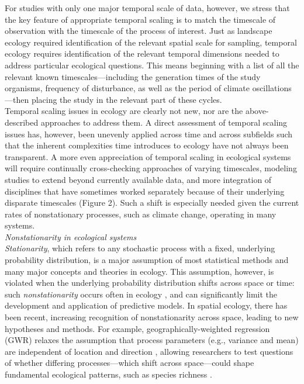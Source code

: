 \documentclass[11pt,a4paper,oneside]{article}
\begin{document}
For studies with only one major temporal scale of data, however, we stress that the key feature of appropriate temporal scaling is to match the timescale of observation with the timescale of the process of interest. Just as landscape ecology required identification of the relevant spatial scale for sampling, temporal ecology requires identification of the relevant temporal dimensions needed to address particular ecological questions. This means beginning with a list of all the relevant known timescales---including the generation times of the study organisms, frequency of disturbance, as well as the period of climate oscillations---then placing the study in the relevant part of these cycles. \\

Temporal scaling issues in ecology are clearly not new, nor are the above-described approaches to address them. A direct assessment of temporal scaling issues has, however, been unevenly applied across time and across subfields such that the inherent complexities time introduces to ecology have not always been transparent. A more even appreciation of temporal scaling in ecological systems will require continually cross-checking approaches of varying timescales, modeling studies to extend beyond currently available data, and more integration of disciplines that have sometimes worked separately because of their underlying disparate timescales (Figure 2). Such a shift is especially needed given the current rates of nonstationary processes, such as climate change, operating in many systems. \\

\noindent \emph{Nonstationarity in ecological systems}\\
\emph{Stationarity}, which refers to any stochastic process with a fixed, underlying probability distribution, is a major assumption of most statistical methods and many major concepts and theories in ecology. This assumption, however, is violated when the underlying probability distribution shifts across space or time: such \emph{nonstationarity} occurs often in ecology \citep{julio2012}, and can significantly limit the development and application of predictive models. In spatial ecology, there has been recent, increasing recognition of nonstationarity across space, leading to new hypotheses and methods. For example, geographically-weighted regression (GWR) relaxes the assumption that process parameters (e.g., variance and mean) are independent of location and direction \citep{Brunsdon:1998nx}, allowing researchers to test questions of whether differing processes---which shift across space---could shape fundamental ecological patterns, such as species richness \citep{davies2011}.\\ %
\end{document}
